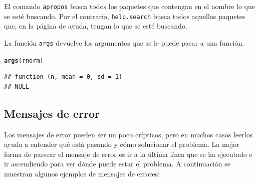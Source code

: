 \documentclass{config/apuntes}\usepackage[]{graphicx}\usepackage[]{xcolor}
\makeatletter
\newcommand{\hldef}[1]{\textcolor[rgb]{0.345,0.345,0.345}{#1}}%
\newcommand{\hlkwd}[1]{\textcolor[rgb]{0.737,0.353,0.396}{\textbf{#1}}}%
\newenvironment{kframe}{%
 \def\at@end@of@kframe{}%
 \ifinner\ifhmode%
  \def\at@end@of@kframe{\end{minipage}}%
  \begin{minipage}{\columnwidth}%
 \fi\fi%
 \def\FrameCommand##1{\hskip\@totalleftmargin \hskip-\fboxsep
 \colorbox{shadecolor}{##1}\hskip-\fboxsep
     \hskip-\linewidth \hskip-\@totalleftmargin \hskip\columnwidth}%
 \MakeFramed {\advance\hsize-\width
   \@totalleftmargin\z@ \linewidth\hsize
   \@setminipage}}%
 {\par\unskip\endMakeFramed%
 \at@end@of@kframe}
\newenvironment{knitrout}{}{} %
\newcommand{\code}[1]{\texttt{#1}}
\makeatother
\begin{document}
El comando \code{apropos} busca todos los paquetes que contengan en el nombre lo que se esté buscando. Por el contrario, \code{help.search} busca todos aquellos paquetes que, en la página de ayuda, tengan lo que se esté buscando. 

La función \code{args} devuelve los argumentos que se le puede pasar a una función.
\begin{knitrout}
\color{fgcolor}\begin{kframe}
\begin{alltt}
\hlkwd{args}\hldef{(rnorm)}
\end{alltt}
\begin{verbatim}
## function (n, mean = 0, sd = 1) 
## NULL
\end{verbatim}
\end{kframe}
\end{knitrout}

\subsection{Mensajes de error}
Los mensajes de error pueden ser un poco crípticos, pero en muchos casos leerlos ayuda a entender qué está pasando y cómo solucionar el problema. La mejor forma de parsear el mensaje de error es ir a la última línea que se ha ejecutado e ir ascendiendo para ver dónde puede estar el problema. A continuación se muestran algunos ejemplos de mensajes de errores:
\end{document}
